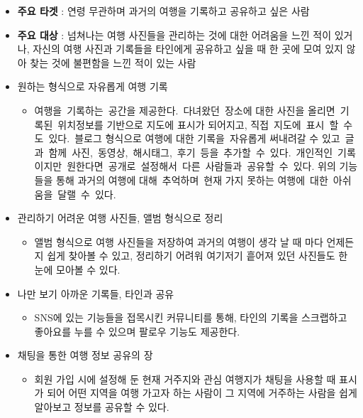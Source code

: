 \begin{itemize}
    \item \textbf{주요 타겟} : 연령 무관하며 과거의 여행을 기록하고 공유하고 싶은 사람
    \item \textbf{주요 대상} : 넘쳐나는 여행 사진들을 관리하는 것에 대한 어려움을 느낀 적이 있거나, 자신의 여행 사진과 기록들을 타인에게 공유하고 싶을 때 한 곳에 모여 있지 않아 찾는 것에 불편함을 느낀 적이 있는 사람 
    \item 원하는 형식으로 자유롭게 여행 기록
    \begin{itemize}
        \item[] 여행을 기록하는 공간을 제공한다. 다녀왔던 장소에 대한 사진을 올리면 기록된 위치정보를 기반으로 지도에 표시가 되어지고, 직접 지도에 표시 할 수도 있다. 블로그 형식으로 여행에 대한 기록을 자유롭게 써내려갈 수 있고 글과 함께 사진, 동영상, 해시태그, 후기 등을 추가할 수 있다. 개인적인 기록이지만 원한다면 공개로 설정해서 다른 사람들과 공유할 수 있다.
        위의 기능들을 통해 과거의 여행에 대해 추억하며 현재 가지 못하는 여행에 대한 아쉬움을 달랠 수 있다.
    \end{itemize}
    
    \item 관리하기 어려운 여행 사진들, 앨범 형식으로 정리
    \begin{itemize}
        \item[] 앨범 형식으로 여행 사진들을 저장하여 과거의 여행이 생각 날 때 마다 언제든지 쉽게 찾아볼 수 있고, 정리하기 어려워 여기저기 흩어져 있던 사진들도 한 눈에 모아볼 수 있다.
    \end{itemize}
    
    \item 나만 보기 아까운 기록들, 타인과 공유
    \begin{itemize}
        \item[] SNS에 있는 기능들을 접목시킨 커뮤니티를 통해, 타인의 기록을 스크랩하고 좋아요를 누를 수 있으며 팔로우 기능도 제공한다. 
    \end{itemize}
    \item 채팅을 통한 여행 정보 공유의 장 
    \begin{itemize}
        \item[] 회원 가입 시에 설정해 둔 현재 거주지와 관심 여행지가 채팅을 사용할 때 표시가 되어 어떤 지역을 여행 가고자 하는 사람이 그 지역에 거주하는 사람을 쉽게 알아보고 정보를 공유할 수 있다.
    \end{itemize}
\end{itemize}
\par\
\newpage

